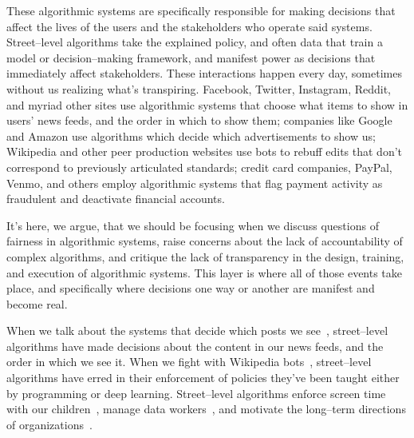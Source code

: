 \documentclass[street-level_algorithms]{subfiles}
\begin{document}
These algorithmic systems are specifically responsible for making
decisions that affect the lives of the users and the stakeholders who operate said systems.
Street--level algorithms take the explained policy,
and often data that train a model or decision--making framework,
and manifest power as decisions that immediately affect stakeholders.
These interactions happen every day, sometimes without us realizing what's transpiring.
Facebook, Twitter, Instagram, Reddit, and myriad other sites
use algorithmic systems that choose
what items to show in users' news feeds, and the order in which to show them;
companies like Google and Amazon
use algorithms which decide which advertisements to show us;
Wikipedia and other peer production websites
use bots to rebuff edits that don't correspond to previously articulated standards;
credit card companies, PayPal, Venmo, and others
employ algorithmic systems that flag payment activity as fraudulent and deactivate financial accounts.

It's here, we argue, that we should be focusing when we discuss
questions of fairness in algorithmic systems,
raise concerns about the lack of accountability of complex algorithms, and
critique the lack of transparency in the design, training, and execution of algorithmic systems.
This layer is where all of those events take place, and
specifically where decisions one way or another are manifest and become real.

When we talk about the systems that decide which posts we see~\cite{Eslami:2015:IAA:2702123.2702556},
street--level algorithms have made decisions about the content in our news feeds, and the order in which we see it.
When we fight with Wikipedia bots~\cite{10.1371/journal.pone.0171774,geiger2018lives,Geiger:2013:LBW:2491055.2491061},
street--level algorithms have erred in their enforcement of policies they've been taught either by programming or deep learning.
Street--level algorithms enforce screen time with our children~\cite{Hiniker:2016:STT:2858036.2858278},
manage data workers~\cite{Boukhelifa:2017:DWC:3025453.3025738,Valentine:2017:FOC:3025453.3025811,foundry},
and motivate the long--term directions of organizations~\cite{Bopp:2017:DDN:3025453.3025694}.
\end{document}
